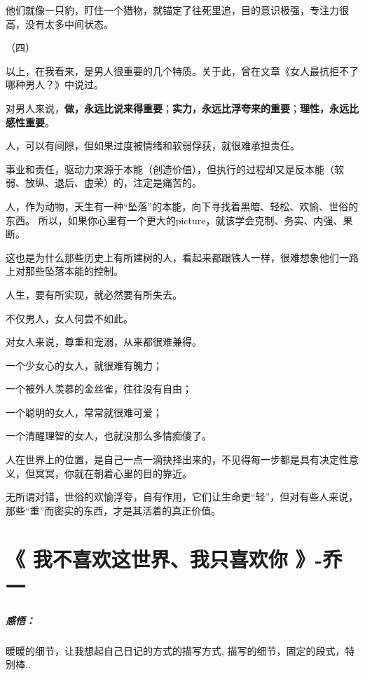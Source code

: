 \documentclass[UTF8,a4paper,8pt]{ctexbook}
\begin{document}
		他们就像一只豹，盯住一个猎物，就锚定了往死里追，目的意识极强，专注力很高，没有太多中间状态。
		
		
		
		（四）
		
		以上，在我看来，是男人很重要的几个特质。关于此，曾在文章《女人最抗拒不了哪种男人？》中说过。
		
		对男人来说，\textbf{做，永远比说来得重要}；\textbf{实力，永远比浮夸来的重要}；\textbf{理性，永远比感性重要}。
		
		人，可以有间隙，但如果过度被情绪和软弱俘获，就很难承担责任。
		
		事业和责任，驱动力来源于本能（创造价值），但执行的过程却又是反本能（软弱、放纵、退后、虚荣）的，注定是痛苦的。
		
		人，作为动物，天生有一种“坠落”的本能，向下寻找着黑暗、轻松、欢愉、世俗的东西。 所以，如果你心里有一个更大的picture，就该学会克制、务实、内强、果断。
		
		这也是为什么那些历史上有所建树的人，看起来都跟铁人一样，很难想象他们一路上对那些坠落本能的控制。
		
		人生，要有所实现，就必然要有所失去。
		
		不仅男人，女人何尝不如此。
		
		对女人来说，尊重和宠溺，从来都很难兼得。
		
		一个少女心的女人，就很难有魄力；
		
		一个被外人羡慕的金丝雀，往往没有自由；
		
		一个聪明的女人，常常就很难可爱；
		
		一个清醒理智的女人，也就没那么多情痴傻了。
		
		人在世界上的位置，是自己一点一滴抉择出来的，不见得每一步都是具有决定性意义，但冥冥，你就在朝着心里的目的靠近。
		
		无所谓对错，世俗的欢愉浮夸，自有作用，它们让生命更“轻”，但对有些人来说，那些“重”而密实的东西，才是其活着的真正价值。 

\newpage
\section{《 我不喜欢这世界、我只喜欢你 》-乔一}
	\subparagraph{感悟：}暖暖的细节，让我想起自己日记的方式的描写方式, 描写的细节，固定的段式，特别棒..
	
\end{document}
